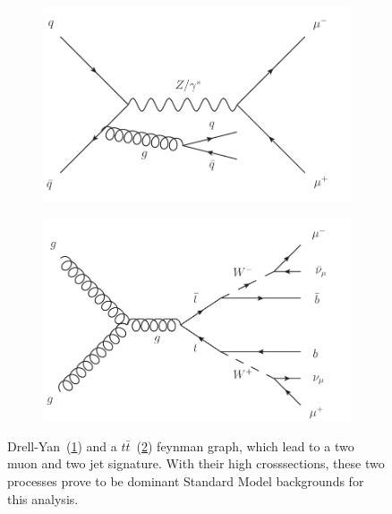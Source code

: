 \begin{figure}[htb!]
  \centering
  \begin{subfigure}[b]{0.495\textwidth}
    \centering
    \includegraphics[width=\textwidth]{plots/dyll.pdf}
    \caption{\label{fig:dyll}}
  \end{subfigure}
  \begin{subfigure}[b]{0.495\textwidth}
    \centering
    \includegraphics[width=\textwidth]{plots/ttbar.pdf}
    \caption{\label{fig:ttbar}}
  \end{subfigure}
  \caption{Drell-Yan~(\ref{fig:dyll}) and a $t\bar{t}$~(\ref{fig:ttbar}) feynman graph, which lead to a two muon and two jet signature. With their high crosssections, these two processes prove to be dominant Standard Model backgrounds for this analysis.}
  \label{fig:dyllttbar}
\end{figure}


